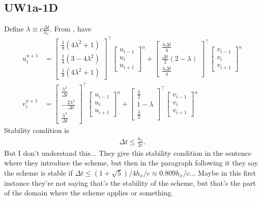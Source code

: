 \documentclass[12pt]{article}
\begin{document}
\subsection{UW1a-1D}
Define $\lambda \equiv c \tfrac{\Delta t}{h_x}$.
From \cite[eqn. (7) \& (8)]{Banks2012}, have
\begin{align}
u_{i}^{n+1} &= 
\begin{bmatrix}
\tfrac{1}{8} (4 \lambda^2 + 1) \\
\tfrac{1}{4}(3 - 4 \lambda^2)  \\
\tfrac{1}{8} (4 \lambda^2 + 1) 
\end{bmatrix}^\top
\begin{bmatrix}
u_{i-1} \\
u_i  \\
u_{i+1} 
\end{bmatrix}^n 
+
\begin{bmatrix}
\tfrac{\lambda \Delta t}{4} \\
\tfrac{\Delta t}{2}(2 - \lambda) \\
\tfrac{\lambda \Delta t}{4} 
\end{bmatrix}^\top
\begin{bmatrix}
v_{i-1} \\
v_i  \\
v_{i+1} 
\end{bmatrix}^n 
\\
v_{i}^{n+1} &= 
\begin{bmatrix}
\tfrac{\lambda^2}{\Delta t} \\
- \tfrac{2 \lambda^2}{\Delta t} \\ 
\tfrac{\lambda^2}{\Delta t}  
\end{bmatrix}^\top
\begin{bmatrix}
u_{i-1} \\
u_i  \\
u_{i+1} 
\end{bmatrix}^n 
+
\begin{bmatrix}
\tfrac{\lambda}{2} \\
1 - \lambda \\
\tfrac{\lambda}{2} 
\end{bmatrix}^\top
\begin{bmatrix}
v_{i-1} \\
v_i  \\
v_{i+1} 
\end{bmatrix}^n 
\end{align}
Stability condition is
\begin{align}
\Delta t \leq \frac{h_x}{2 c}.
\end{align}
But I don't understand this... They give this stability condition in the sentence where they introduce the scheme, but then in the paragraph following it they say the scheme is stable if $\Delta t \leq (1 + \sqrt{5})/4 h_x /c \approx 0.809 h_x /c$... Maybe in this first instance they're not saying that's the stability of the scheme, but that's the part of the domain where the scheme applies or something.
\end{document}
